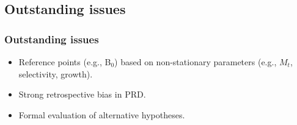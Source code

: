 \subsection{Outstanding issues} %
\label{sub:outstanding_issues}
\begin{frame}[t]\frametitle{Outstanding issues}
	\begin{itemize}
		\item<+-> Reference points (e.g., B$_0$) based on non-stationary parameters (e.g., $M_t$, selectivity, growth).
		\item<+-> Strong retrospective bias in PRD.
		\item<+-> Formal evaluation of alternative hypotheses.
	\end{itemize}
\end{frame}

